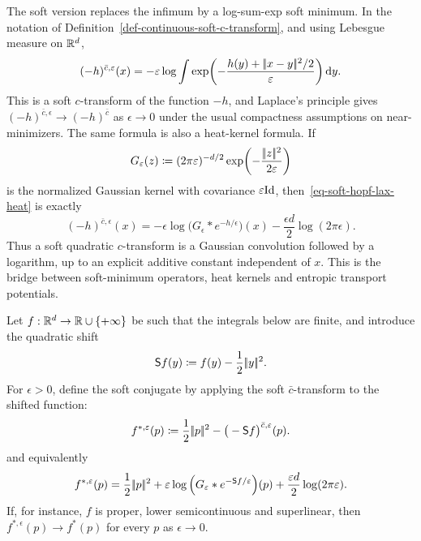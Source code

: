 The soft version replaces the infimum by a log-sum-exp soft minimum. In the notation of Definition~\ref{def-continuous-soft-c-transform}, and using Lebesgue measure on $\mathbb{R}^d$,
\begin{equation}\label{eq-soft-hopf-lax-heat}
	(-h)^{\bar c,\varepsilon}(x)
	=
	-\varepsilon\log
	\int
	\exp\!\left(
	-\frac{h(y)+|\!| x-y |\!|^2/2}{\varepsilon}
	\right)\mathrm{d} y.
	\end{equation}
This is a soft $c$-transform of the function $-h$, and Laplace's principle gives $(-h)^{\bar c,\epsilon}\to(-h)^{\bar c}$ as $\epsilon\to0$ under the usual compactness assumptions on near-minimizers. The same formula is also a heat-kernel formula. If
\[
	G_\varepsilon(z)\coloneqq (2\pi\varepsilon)^{-d/2}\exp\!\left(-\frac{|\!| z |\!|^2}{2\varepsilon}\right)
\]
is the normalized Gaussian kernel with covariance $\varepsilon\mathrm{Id}$, then~\eqref{eq-soft-hopf-lax-heat} is exactly
\begin{equation}\label{eq-soft-c-transform-gaussian-convolution}
	(-h)^{\bar c,\epsilon}(x)
	=
	-\epsilon\log\Big(G_\epsilon\ast e^{-h/\epsilon}\Big)(x)
	-\frac{\epsilon d}{2}\log(2\pi\epsilon).
\end{equation}
Thus a soft quadratic $c$-transform is a Gaussian convolution followed by a logarithm, up to an explicit additive constant independent of $x$. This is the bridge between soft-minimum operators, heat kernels and entropic transport potentials.

\begin{prop}\label{prop-soft-legendre-convolution}
Let $f:\mathbb{R}^d\to\mathbb{R}\cup\{+\infty\}$ be such that the integrals below are finite, and introduce the quadratic shift
\[
	\mathsf S f(y)\coloneqq f(y)-\frac12|\!| y |\!|^2.
\]
For $\epsilon>0$, define the soft conjugate by applying the soft $\bar c$-transform to the shifted function:
\begin{equation}\label{eq-soft-legendre-definition}
	f^{*,\varepsilon}(p)
	\coloneqq
	\frac12|\!| p |\!|^2-\big(-\mathsf S f\big)^{\bar c,\varepsilon}(p).
\end{equation}
and equivalently
\begin{equation}\label{eq-soft-legendre-convolution}
	f^{*,\varepsilon}(p)
	=
	\frac12|\!| p |\!|^2
	+\varepsilon\log\Big(G_\varepsilon\ast e^{-\mathsf S f/\varepsilon}\Big)(p)
	+\frac{\varepsilon d}{2}\log(2\pi\varepsilon).
\end{equation}
If, for instance, $f$ is proper, lower semicontinuous and superlinear, then $f^{*,\epsilon}(p)\to f^*(p)$ for every $p$ as $\epsilon\to0$.
\end{prop}

